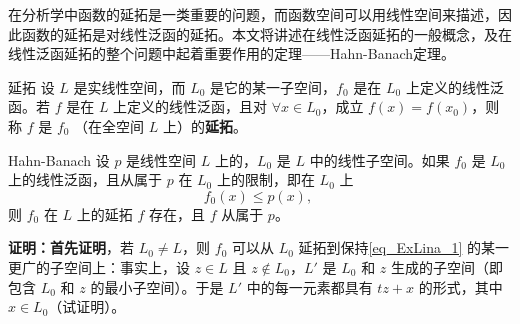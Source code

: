 
\cite{Ke1}在分析学中函数的延拓是一类重要的问题，而函数空间可以用线性空间来描述，因此函数的延拓是对线性泛函的延拓。本文将讲述在线性泛函延拓的一般概念，及在线性泛函延拓的整个问题中起着重要作用的定理——Hahn-Banach定理。

\begin{definition}{延拓}
设 $L$ 是实线性空间，而 $L_0$ 是它的某一子空间，$f_0$ 是在 $L_0$ 上定义的线性泛函。若 $f$ 是在 $L$ 上定义的线性泛函，且对 $\forall x\in L_0$，成立 $f(x)=f(x_0)$，则称 $f$ 是 $f_0$ （在全空间 $L$ 上）的\textbf{延拓}。
\end{definition}


\begin{theorem}{Hahn-Banach}
设 $p$ 是线性空间 $L$ 上的，$L_0$ 是 $L$ 中的线性子空间。如果 $f_0$ 是 $L_0$ 上的线性泛函，且从属于 $p$ 在 $L_0$ 上的限制，即在 $L_0$ 上
\begin{equation}\label{eq_ExLina_1}
f_0(x)\leq p(x),~
\end{equation}
则 $f_0$ 在 $L$ 上的延拓 $f$ 存在，且 $f$ 从属于 $p$。
\end{theorem}

\textbf{证明：}\textbf{首先证明}，若 $L_0\neq L$，则 $f_0$ 可以从 $L_0$ 延拓到保持\autoref{eq_ExLina_1} 的某一更广的子空间上：事实上，设 $z\in L$ 且 $z\notin L_0$，$L'$ 是 $L_0$ 和 $z$ 生成的子空间（即包含 $L_0$ 和 $z$ 的最小子空间）。于是 $L'$ 中的每一元素都具有 $tz+x$ 的形式，其中 $x\in L_0$（试证明）。

